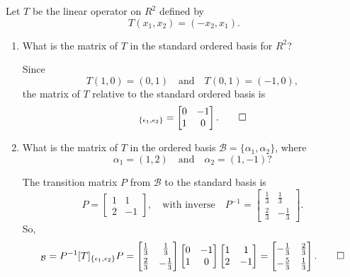  Let $T$ be the linear operator on $R^2$ defined by
\begin{equation*}
  T(x_1,x_2) = (-x_2, x_1).
\end{equation*}
\begin{enumerate}
\item What is the matrix of $T$ in the standard ordered basis for
  $R^2$?
  \begin{solution}
    Since
    \begin{equation*}
      T(1, 0) = (0, 1) \quad\text{and}\quad T(0, 1) = (-1, 0),
    \end{equation*}
    the matrix of $T$ relative to the standard ordered basis is
    \begin{equation*}
      [T]_{\{\epsilon_1,\epsilon_2\}} =
      \begin{bmatrix}
        0 & -1 \\
        1 & 0
      \end{bmatrix}. \qedhere
    \end{equation*}
  \end{solution}

\item What is the matrix of $T$ in the ordered basis
  $\mathcal{B} = \{\alpha_1,\alpha_2\}$, where
  \begin{equation*}
    \alpha_1 = (1,2) \quad\text{and}\quad
    \alpha_2 = (1,-1)?
  \end{equation*}
  \begin{solution}
    The transition matrix $P$ from $\mathcal{B}$ to the standard basis
    is
    \begin{equation*}
      P =
      \begin{bmatrix}
        1 & 1 \\
        2 & -1
      \end{bmatrix},
      \quad\text{with inverse}\quad
      P^{-1} =
      \begin{bmatrix}
        \frac13 & \frac13 \\[3pt]
        \frac23 & -\frac13
      \end{bmatrix}.
    \end{equation*}
    So,
    \begin{equation*}
      [T]_{\mathcal{B}} = P^{-1}[T]_{\{\epsilon_1,\epsilon_2\}}P
      =
      \begin{bmatrix}
        \frac13 & \frac13 \\[3pt]
        \frac23 & -\frac13
      \end{bmatrix}
      \begin{bmatrix}
        0 & -1 \\
        1 & 0
      \end{bmatrix}
      \begin{bmatrix}
        1 & 1 \\
        2 & -1
      \end{bmatrix}
      =
      \begin{bmatrix}
        -\frac13 & \frac23 \\[3pt]
        -\frac53 & \frac13
      \end{bmatrix}. \qedhere
    \end{equation*}
  \end{solution}


\end{enumerate}
